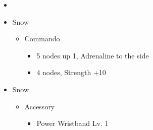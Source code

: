 \documentclass{report}
\begin{document}
\begin{menu}
\begin{itemize}
    \paradigm
    \begin{itemize}
        \item {}%
{\paradigmline{\textit{\com}}{\textit{\rav}}{}}%
{\paradigmline{\com}{\med}{}}%
{\paradigmline{\sen}{\med}{}}%
{\paradigmline{\sen}{\syn}{}}%
{\paradigmline{[\rav]}{\rav}{}}%
{\paradigmline{[\rav]}{\rav}{}}
    \end{itemize}
    \crystarium
    \begin{itemize}
        \item Snow
        \begin{itemize}
            \item Commando
            \begin{itemize}
                \item 5 nodes up 1, Adrenaline to the side
                \item 4 nodes, Strength +10
            \end{itemize}
        \end{itemize}
    \end{itemize}
    \equip
    \begin{itemize}
        \item Snow
        \begin{itemize}
            \item Accessory
            \begin{itemize}
                \item Power Wristband Lv. 1
            \end{itemize}
        \end{itemize}
    \end{itemize}
\end{itemize}
\end{menu}
\renewcommand{\first}{[1] Slash \& Burn (\com/\rav)}
\renewcommand{\second}{[2] War \& Peace (\com/\med)}
\renewcommand{\fifth}{[5] Dualcasting (\rav/\rav)}
\renewcommand{\sixth}{[6] Dualcasting (\rav/\rav)}
\end{document}
